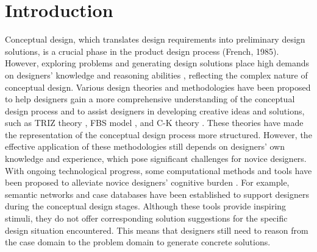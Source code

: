 \documentclass{dsj}
\begin{document}
\section{Introduction}
Conceptual design, which translates design requirements into preliminary design solutions, is a crucial phase in the product design process (French, 1985). However, exploring problems and generating design solutions place high demands on designers' knowledge and reasoning abilities \citep{myrup2015conceptual}, reflecting the complex nature of conceptual design. Various design theories and methodologies have been proposed to help designers gain a more comprehensive understanding of the conceptual design process and to assist designers in developing creative ideas and solutions, such as TRIZ theory \citep{altshuller1999innovation}, FBS model \citep{gero2014function}, and C-K theory \citep{hatchuel2009ck}. These theories have made the representation of the conceptual design process more structured. However, the effective application of these methodologies still depends on designers' own knowledge and experience, which pose significant challenges for novice designers. With ongoing technological progress, some computational methods and tools have been proposed to alleviate novice designers' cognitive burden \citep{sarica2024innovation, cantamessa2020data}. For example, semantic networks \citep{luo2019computer, shi2017data} and case databases \citep{robles2009case, deldin2013asknature} have been established to support designers during the conceptual design stages. Although these tools provide inspiring stimuli, they do not offer corresponding solution suggestions for the specific design situation encountered. This means that designers still need to reason from the case domain to the problem domain to generate concrete solutions. 
\end{document}

